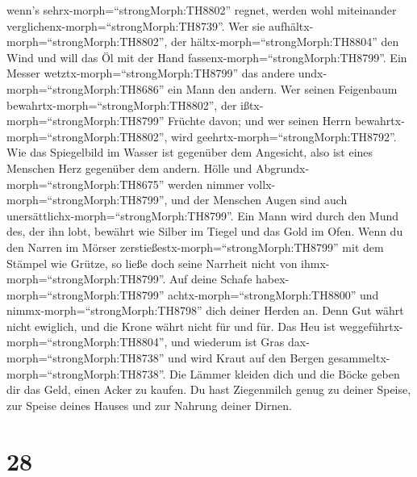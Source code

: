 wenn's sehrx-morph=``strongMorph:TH8802'' regnet, werden wohl
miteinander verglichenx-morph=``strongMorph:TH8739''.  Wer
sie aufhältx-morph=``strongMorph:TH8802'', der
hältx-morph=``strongMorph:TH8804'' den Wind und will das Öl mit der Hand
fassenx-morph=``strongMorph:TH8799''.  Ein Messer
wetztx-morph=``strongMorph:TH8799'' das andere
undx-morph=``strongMorph:TH8686'' ein Mann den andern.  Wer
seinen Feigenbaum bewahrtx-morph=``strongMorph:TH8802'', der
ißtx-morph=``strongMorph:TH8799'' Früchte davon; und wer seinen Herrn
bewahrtx-morph=``strongMorph:TH8802'', wird
geehrtx-morph=``strongMorph:TH8792''.  Wie das Spiegelbild
im Wasser ist gegenüber dem Angesicht, also ist eines Menschen Herz
gegenüber dem andern.  Hölle und
Abgrundx-morph=``strongMorph:TH8675'' werden nimmer
vollx-morph=``strongMorph:TH8799'', und der Menschen Augen sind auch
unersättlichx-morph=``strongMorph:TH8799''.  Ein Mann wird
durch den Mund des, der ihn lobt, bewährt wie Silber im Tiegel und das
Gold im Ofen.  Wenn du den Narren im Mörser
zerstießestx-morph=``strongMorph:TH8799'' mit dem Stämpel wie Grütze, so
ließe doch seine Narrheit nicht von ihmx-morph=``strongMorph:TH8799''.
 Auf deine Schafe habex-morph=``strongMorph:TH8799''
achtx-morph=``strongMorph:TH8800'' und
nimmx-morph=``strongMorph:TH8798'' dich deiner Herden an. 
Denn Gut währt nicht ewiglich, und die Krone währt nicht für und für.
 Das Heu ist weggeführtx-morph=``strongMorph:TH8804'', und
wiederum ist Gras dax-morph=``strongMorph:TH8738'' und wird Kraut auf
den Bergen gesammeltx-morph=``strongMorph:TH8738''.  Die
Lämmer kleiden dich und die Böcke geben dir das Geld, einen Acker zu
kaufen.  Du hast Ziegenmilch genug zu deiner Speise, zur
Speise deines Hauses und zur Nahrung deiner Dirnen.

\hypertarget{section-27}{%
\section{28}\label{section-27}}


